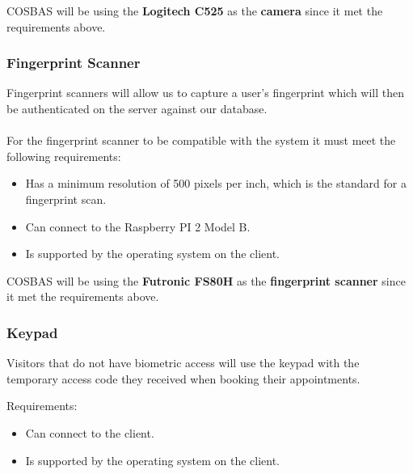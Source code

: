 COSBAS will be using the \textbf{Logitech C525} as the \textbf{ camera} since it met the requirements above.
	
	\subsubsection{Fingerprint Scanner}
	Fingerprint scanners will allow us to capture a user's fingerprint which will then be authenticated on the server against our database. \\
\\
For the fingerprint scanner to be compatible with the system it must meet the following requirements:
	\begin{itemize}
		\item Has a minimum resolution of 500 pixels per inch, which is the standard for a fingerprint scan.
		\item Can connect to the Raspberry PI 2 Model B.
		\item Is supported by the operating system on the client.
	\end{itemize}
	
COSBAS will be using the \textbf{Futronic FS80H} as the \textbf{fingerprint scanner} since it met the requirements above.
	
	\subsubsection{Keypad}
Visitors that do not have biometric access will use the keypad with the temporary access code they received when booking their appointments.

Requirements:
	\begin{itemize}
		\item Can connect to the client.
		\item Is supported by the operating system on the client.
	\end{itemize}


		